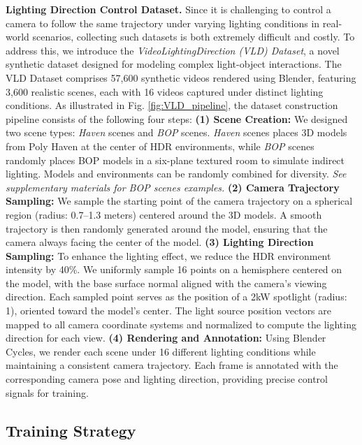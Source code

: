 \noindent\textbf{Lighting Direction Control Dataset.}
Since it is challenging to control a camera to follow the same trajectory under varying lighting conditions in real-world scenarios, collecting such datasets is both extremely difficult and costly. To address this, we introduce the \textit{VideoLightingDirection (VLD) Dataset}, a novel synthetic dataset designed for modeling complex light-object interactions. The VLD Dataset comprises 57,600 synthetic videos rendered using Blender, featuring 3,600 realistic scenes, each with 16 videos captured under distinct lighting conditions. As illustrated in Fig. \ref{fig:VLD_pipeline}, the dataset construction pipeline consists of the following four steps:
\textbf{(1) Scene Creation: } 
We designed two scene types: \textit{Haven} scenes and \textit{BOP} scenes. \textit{Haven} scenes places 3D models from Poly Haven at the center of HDR environments, while \textit{BOP} scenes randomly places BOP models in a six-plane textured room to simulate indirect lighting. Models and environments can be randomly combined for diversity. \textit{See supplementary materials for BOP scenes examples.}
\textbf{(2) Camera Trajectory Sampling: }
We sample the starting point of the camera trajectory on a spherical region (radius: 0.7–1.3 meters) centered around the 3D models. A smooth trajectory is then randomly generated around the model, ensuring that the camera always facing the center of the model.
\textbf{(3) Lighting Direction Sampling: }
To enhance the lighting effect, we reduce the HDR environment intensity by 40\%. We uniformly sample 16 points on a hemisphere centered on the model, with the base surface normal aligned with the camera's viewing direction. Each sampled point serves as the position of a 2kW spotlight (radius: 1), oriented toward the model's center. The light source position vectors are mapped to all camera coordinate systems and normalized to compute the lighting direction for each view.
\textbf{(4) Rendering and Annotation: }
Using Blender Cycles, we render each scene under 16 different lighting conditions while maintaining a consistent camera trajectory. Each frame is annotated with the corresponding camera pose and lighting direction, providing precise control signals for training. 




\subsection{Training Strategy}
\label{subsec:training_strategy}

